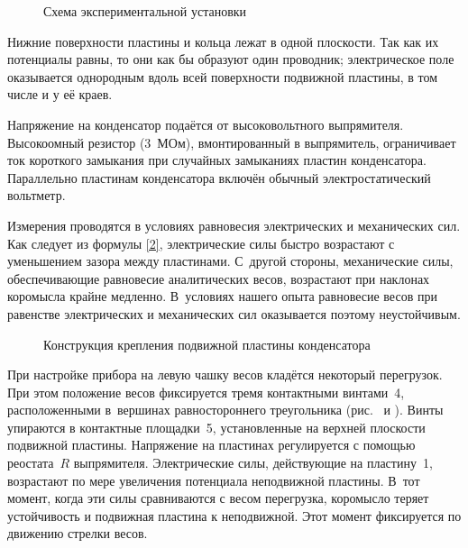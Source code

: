 \begin{figure}[h!]
    \centering
    \caption{Схема экспериментальной установки}
\end{figure}

Нижние поверхности пластины и кольца лежат в одной плоскости. Так как их
потенциалы равны, то они как бы образуют один
проводник; электрическое поле оказывается однородным вдоль всей поверхности
подвижной пластины, в том числе и у её краев.

Напряжение на конденсатор подаётся от высоковольтного выпрямителя. Высокоомный
резистор (3~МОм), вмонтированный в
выпрямитель, ограничивает ток короткого замыкания при случайных замыканиях
пластин конденсатора. Параллельно пластинам
конденсатора включён обычный электростатический вольтметр.

Измерения проводятся в условиях равновесия электрических и механических сил. Как
следует из формулы \eqref{2},
электрические силы быстро возрастают с уменьшением зазора между пластинами. 
С~другой стороны, механические силы,
обеспечивающие равновесие аналитических весов, возрастают при наклонах коромысла
крайне медленно. В~условиях нашего опыта равновесие весов при равенстве
электрических и механических сил оказывается поэтому неустойчивым.

\begin{wrapfigure}[17]{o}{0.35\textwidth}
	\caption{Конструкция крепления подвижной пластины конденсатора}
\end{wrapfigure}

При настройке прибора на левую чашку весов кладётся некоторый перегрузок. При
этом положение весов фиксируется тремя
контактными винтами~4, расположенными в~вершинах равностороннего треугольника
(рис.~ и ). 
Винты упираются в
контактные площадки~5, установленные на верхней плоскости подвижной пластины.
Напряжение на пластинах регулируется с
помощью реостата~$R$ выпрямителя. Электрические силы, действующие на пластину~1,
возрастают по мере увеличения
потенциала неподвижной пластины. В~тот момент, когда эти силы сравниваются
с весом перегрузка, коромысло теряет
устойчивость и подвижная пластина  к неподвижной. Этот момент
фиксируется по движению стрелки весов.

